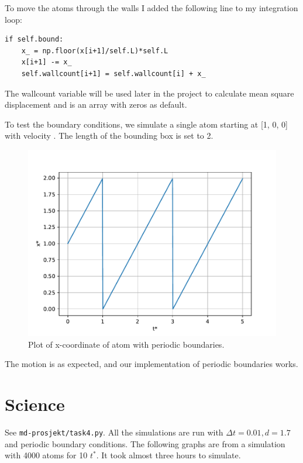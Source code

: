 \documentclass[a4paper,10pt,english]{article}
\begin{document}
To move the atoms through the walls I added the following line to my integration loop:
\begin{lstlisting}
if self.bound:
    x_ = np.floor(x[i+1]/self.L)*self.L
    x[i+1] -= x_
    self.wallcount[i+1] = self.wallcount[i] + x_
\end{lstlisting}
The wallcount variable will be used later in the project to calculate mean square displacement and is an array with zeros as default.

\newpage

To test the boundary conditions, we simulate a single atom starting at [1, 0, 0] with velocity \newline [1, 0, 0]. The length of the bounding box is set to 2.

\begin{figure}[h!]
    \centering
    \includegraphics[scale=0.65]{../figures/3_e.pdf}
    \caption{Plot of x-coordinate of atom with periodic boundaries.}
    \label{fig:boundaries}
\end{figure}

The motion is as expected, and our implementation of periodic boundaries works.

\newpage

\section{Science} \label{4}

See \verb|md-prosjekt/task4.py|. All the simulations are run with $\Delta t = 0.01, d=1.7$ and periodic boundary conditions. The following graphs are from a simulation with 4000 atoms for 10 $t^*$. It took almost three hours to simulate.
\end{document}
